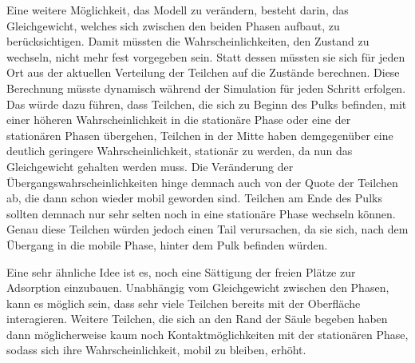 Eine weitere Möglichkeit, das Modell zu verändern, besteht darin, das Gleichgewicht, welches sich zwischen den beiden Phasen aufbaut, zu berücksichtigen. Damit müssten die Wahrscheinlichkeiten, den Zustand zu wechseln, nicht mehr fest vorgegeben sein. 
Statt dessen müssten sie sich für jeden Ort aus der aktuellen Verteilung der Teilchen auf die Zustände berechnen. Diese Berechnung müsste dynamisch während der Simulation für jeden Schritt erfolgen. 
Das würde dazu führen, dass Teilchen, die sich zu Beginn des Pulks befinden, mit einer höheren Wahrscheinlichkeit in die stationäre Phase oder eine der stationären Phasen übergehen, Teilchen in der Mitte haben demgegenüber eine deutlich geringere Wahrscheinlichkeit, stationär zu werden, da nun das Gleichgewicht gehalten werden muss. Die Veränderung der Übergangswahrscheinlichkeiten hinge demnach auch von der Quote der Teilchen ab, die dann schon wieder mobil geworden sind. Teilchen am Ende des Pulks sollten demnach nur sehr selten noch in eine stationäre Phase wechseln können. Genau diese Teilchen würden jedoch einen Tail verursachen, da sie sich, nach dem Übergang in die mobile Phase, hinter dem Pulk befinden würden.

Eine sehr ähnliche Idee ist es, noch eine Sättigung der freien Plätze zur Adsorption einzubauen. Unabhängig vom Gleichgewicht zwischen den Phasen, kann es möglich sein, dass sehr viele Teilchen bereits mit der Oberfläche interagieren. Weitere Teilchen, die sich an den Rand der Säule begeben haben dann möglicherweise kaum noch Kontaktmöglichkeiten mit der stationären Phase, sodass sich ihre Wahrscheinlichkeit, mobil zu bleiben, erhöht.

